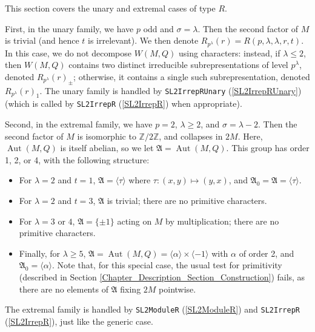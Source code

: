 \documentclass[a4paper,11pt]{report}
\begin{document}
{{{ This section covers the unary and extremal cases of type $R$. 

 First, in the unary family, we have $p$ odd and $\sigma = \lambda$. Then the second factor of $M$ is trivial (and hence $t$ is irrelevant). We then denote $R_{p^\lambda}(r) = R(p,\lambda,\lambda,r,t)$. In this case, we do not decompose $W(M,Q)$ using characters: instead, if $\lambda \leq 2$, then $W(M,Q)$ contains two distinct irreducible subrepresentations of level $p^\lambda$, denoted $R_{p^\lambda}(r)_{\pm}$; otherwise, it contains a single such subrepresentation, denoted $R_{p^\lambda}(r)_1$. The unary family is handled by \texttt{SL2IrrepRUnary} (\ref{SL2IrrepRUnary}) (which is called by \texttt{SL2IrrepR} (\ref{SL2IrrepR}) when appropriate). 

 Second, in the extremal family, we have $p=2$, $\lambda \geq 2$, and $\sigma = \lambda - 2$. Then the second factor of $M$ is isomorphic to $\mathbb{Z}/2\mathbb{Z}$, and collapses in $2M$. Here, $\operatorname{Aut}(M,Q)$ is itself abelian, so we let $\mathfrak{A} = \operatorname{Aut}(M,Q)$. This group has order 1, 2, or 4, with the following structure: 
\begin{itemize}
\item For $\lambda = 2$ and $t=1$, $\mathfrak{A} = \langle \tau \rangle$ where $\tau : (x,y) \mapsto (y,x)$, and $\mathfrak{A}_0 = \mathfrak{A} = \langle\tau\rangle$.
\item For $\lambda = 2$ and $t = 3$, $\mathfrak{A}$ is trivial; there are no primitive characters.
\item For $\lambda = 3$ or $4$, $\mathfrak{A} = \{\pm 1\}$ acting on $M$ by multiplication; there are no primitive characters.
\item Finally, for $\lambda \geq 5$, $\mathfrak{A} = \operatorname{Aut}(M,Q) = \langle \alpha \rangle \times \langle
-1 \rangle$ with $\alpha$ of order 2, and $\mathfrak{A}_0 = \langle\alpha\rangle$. Note that, for this special case, the usual test for primitivity (described
in Section \ref{Chapter_Description_Section_Construction}) fails, as there are no elements of $\mathfrak{A}$ fixing $2M$ pointwise.
\end{itemize}
 The extremal family is handled by \texttt{SL2ModuleR} (\ref{SL2ModuleR}) and \texttt{SL2IrrepR} (\ref{SL2IrrepR}), just like the generic case. 

 }

 }

 }

   
\end{document}
